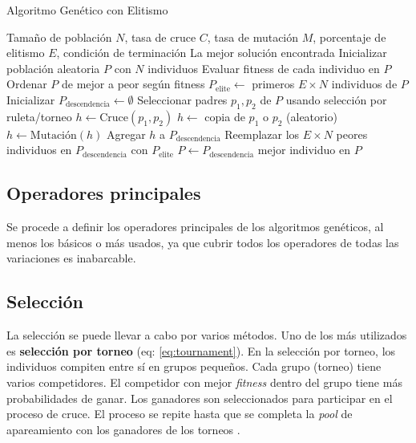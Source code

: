 \documentclass[12pt,letterpaper]{article}
\begin{document}
\begin{algorithm}
    \caption{Algoritmo Genético con Elitismo}
    \begin{algorithmic}[1]
        \Require Tamaño de población \( N \), tasa de cruce \( C \), tasa de mutación \( M \), porcentaje de elitismo \( E \), condición de terminación
        \Ensure La mejor solución encontrada
        \State Inicializar población aleatoria \( P \) con \( N \) individuos
        \State Evaluar fitness de cada individuo en \( P \)
        \State Ordenar \( P \) de mejor a peor según fitness
        \State \( P_{\text{elite}} \gets \) primeros \( E \times N \) individuos de \( P \)
        \State Inicializar \( P_{\text{descendencia}} \gets \emptyset \)
        \State Seleccionar padres \( p_1, p_2 \) de \( P \) usando selección por ruleta/torneo
        \State \( h \gets \text{Cruce}(p_1, p_2) \)
        \Else
        \State \( h \gets \) copia de \( p_1 \) o \( p_2 \) (aleatorio)
        \EndIf
        \State \( h \gets \text{Mutación}(h) \)
        \EndIf
        \State Agregar \( h \) a \( P_{\text{descendencia}} \)
        \EndFor
        \State Reemplazar los \( E \times N \) peores individuos en \( P_{\text{descendencia}} \) con \( P_{\text{elite}} \)
        \State \( P \gets P_{\text{descendencia}} \)
        \EndWhile
        \State \Return mejor individuo en \( P \)
    \end{algorithmic}
\end{algorithm}


\subsection{Operadores principales}
Se procede a definir los operadores principales de los algoritmos genéticos, al menos los básicos o más usados, ya que cubrir todos los operadores de todas las variaciones es inabarcable.

\subsection{Selección}
La selección se puede llevar a cabo por varios métodos. Uno de los más utilizados es \textbf{selección por torneo} (eq: \ref{eq:tournament}). En la selección por torneo, los individuos compiten entre sí en grupos pequeños. Cada grupo (torneo) tiene varios competidores. El competidor con mejor \textit{fitness} dentro del grupo tiene más probabilidades de ganar. Los ganadores son seleccionados para participar en el proceso de cruce.
El proceso se repite hasta que se completa la \textit{pool} de apareamiento con los ganadores de los torneos \cite{miller_genetic_nodate}.
\end{document}
